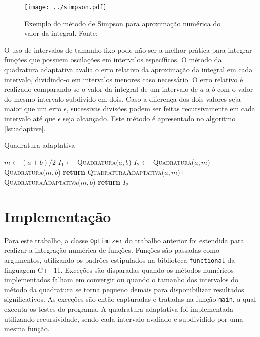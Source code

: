 \begin{figure}
  \centering
  \texttt{[image: ../simpson.pdf]}
  \caption[Exemplo do método de Simpson para aproximação numérica do valor da integral.]{Exemplo do método de Simpson para aproximação numérica do valor da integral. Fonte: \protect\cite{wiki:numeint}}
  \label{fig:simpson}
\end{figure}

O uso de intervalos de tamanho fixo pode não ser a melhor prática para integrar funções que possuem oscilações em intervalos específicos. O método da quadratura adaptativa \cite{press_numerical_2007} avalia o erro relativo da aproximação da integral em cada intervalo, dividindo-o em intervalos menores caso necessário. O erro relativo é realizado comparando-se o valor da integral de um intervalo de \(a\) a \(b\) com o valor do mesmo intervalo subdivido em dois. Caso a diferença dos dois valores seja maior que um erro \(\epsilon\), sucessivas divisões podem ser feitas recursivamente em cada intervalo até que \(\epsilon\) seja alcançado. Este método é apresentado no algoritmo \ref{lst:adaptive}.

\begin{algorithm}
\caption{Quadratura adaptativa}\label{lst:adaptive}
\begin{algorithmic}[1]
\State $m \gets (a + b) / 2$
\State $I_1 \gets $ \textsc{Quadratura($a, b$)}
\State $I_2 \gets $ \textsc{Quadratura($a, m$)} \(+\) \textsc{Quadratura($m, b$)}
  \State \textbf{return} \textsc{QuadraturaAdaptativa(\(a, m\))}\(+\) \textsc{QuadraturaAdaptativa(\(m, b\))}
\EndIf
\State \textbf{return} $I_2$ 
\EndProcedure
\end{algorithmic}
\end{algorithm}

\chapter{Implementação}

Para este trabalho, a classe \texttt{Optimizer} do trabalho anterior foi estendida para realizar a integração numérica de funções. Funções são passadas como argumentos, utilizando os padrões estipulados na biblioteca \texttt{functional} da linguagem C++11. Exceções são disparadas quando os métodos numéricos implementados falham em convergir ou quando o tamanho dos intervalos do método da quadratura se torna pequeno demais para disponibilizar resultados significativos. As exceções são então capturadas e tratadas na função \texttt{main}, a qual executa os testes do programa. A quadratura adaptativa foi implementada utilizando recursividade, sendo cada intervalo avaliado e subdividido por uma mesma função.
